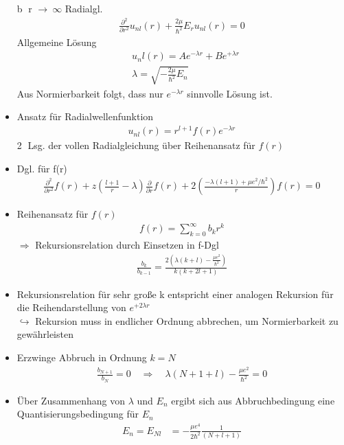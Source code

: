 \documentclass[10pt,article,colorback,accentcolor=tud9d]{scrartcl}
\begin{document}
\begin{itemize}
    \textcircled{b} r $\rightarrow~\infty$ Radialgl.
    \begin{align}
    \frac{\partial^2}{\partial r^2}u_{nl}(r)+\frac{2\mu}{\hbar^2}E_ru_{nl}(r)=0
    \end{align}
    Allgemeine Lösung
    \begin{align}
    &u_nl(r)=Ae^{-\lambda r}+Be^{+\lambda r}\\
    &\lambda=\sqrt{-\frac{2\mu}{\hbar^2}E_n}
    \end{align}
    Aus Normierbarkeit folgt, dass nur $e^{-\lambda r}$ sinnvolle Lösung ist.
  \item Ansatz für Radialwellenfunktion
    \begin{align}
    u_{nl}(r)=r^{l+1}f(r)e^{-\lambda r}
    \end{align}
    \textcircled{2} Lsg. der vollen Radialgleichung über Reihenansatz für $f(r)$
  \item Dgl. für f(r)
    \begin{align}
    \frac{\partial^2}{\partial r^2}f(r)+z\left(\frac{l+1}{r}-\lambda\right)\frac{\partial}{\partial r}f(r)+2\left(\frac{-\lambda(l+1)+\mu e^2/\hbar^2}{r}\right)f(r)=0
    \end{align}
  \item Reihenansatz für $f(r)$
    \begin{align}
    f(r)=\sum^\infty_{k=0}b_kr^k
    \end{align}
    $\Rightarrow$ Rekursionsrelation durch Einsetzen in f-Dgl
    \begin{align}
    \frac{b_k}{b_{k-1}}=\frac{2\left(\lambda(k+l)-\frac{\mu e^2}{\hbar^2}\right)}{k(k+2l+1)}
    \end{align}
  \item Rekursionsrelation für sehr große k entspricht einer analogen Rekursion für die Reihendarstellung von $e^{+2\lambda r}$\\
    $\hookrightarrow$ Rekursion muss in endlicher Ordnung abbrechen, um Normierbarkeit zu gewährleisten
  \item Erzwinge Abbruch in Ordnung $k=N$
    \begin{align}
    \frac{b_{N+1}}{b_N}=0\quad \Rightarrow\quad \lambda(N+1+l)-\frac{\mu e^2}{\hbar^2}=0
    \end{align}
  \item Über Zusammenhang von $\lambda$ und $E_n$ ergibt sich aus Abbruchbedingung eine Quantisierungsbedingung für $E_n$ 
    \begin{align}
    E_n=E_{Nl}&=-\frac{\mu e^4}{2\hbar^2}\frac{1}{(N+l+1)}\\

\end{align}
\end{itemize}
\end{document}
